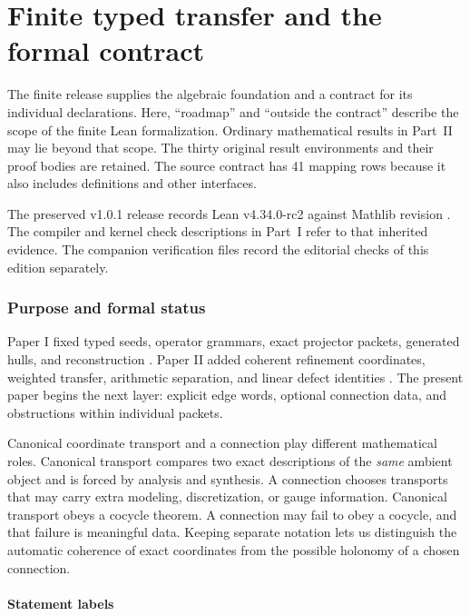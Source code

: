 \part{Finite typed transfer and the formal contract}\label{part:finite}
\noindent The finite release supplies the algebraic foundation and a contract for its individual declarations. Here, ``roadmap'' and ``outside the contract'' describe the scope of the finite Lean formalization. Ordinary mathematical results in Part~II may lie beyond that scope. The thirty original result environments and their proof bodies are retained. The source contract has 41 mapping rows because it also includes definitions and other interfaces.

\medskip\noindent The preserved v1.0.1 release records Lean v4.34.0-rc2 against Mathlib revision  \cite{lean,mathlib}. The compiler and kernel check descriptions in Part~I refer to that inherited evidence. The companion verification files record the editorial checks of this edition separately.
\section{Purpose and formal status}
\label{sec:purpose}

Paper I fixed typed seeds, operator grammars, exact projector packets,
generated hulls, and reconstruction \cite{paperI}.  Paper II added coherent
refinement coordinates, weighted transfer, arithmetic separation, and linear
defect identities \cite{paperII}.  The present paper begins the next layer:
explicit edge words, optional connection data, and obstructions within
individual packets.

Canonical coordinate transport and a connection play different mathematical
roles. Canonical transport compares two exact descriptions of the
\emph{same} ambient object and is forced by analysis and synthesis. A
connection chooses transports that may carry extra modeling, discretization,
or gauge information. Canonical transport obeys a cocycle theorem. A
connection may fail to obey a cocycle, and that failure is meaningful data.
Keeping separate notation lets us distinguish the automatic coherence of
exact coordinates from the possible holonomy of a chosen connection.

\subsection{Statement labels}


